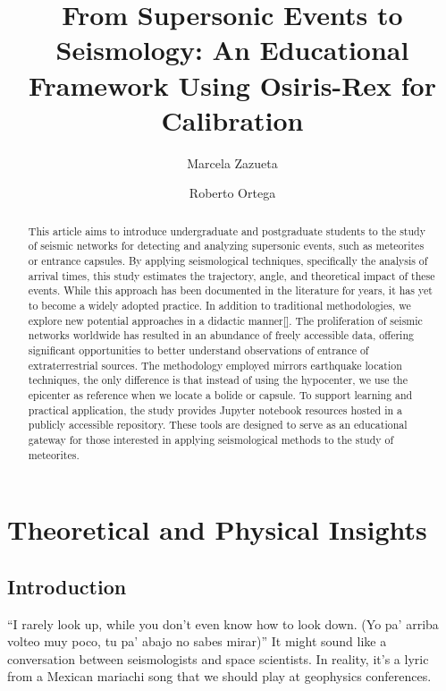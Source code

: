 \documentclass[linenum]{SSA-SRL}
\begin{document}
\title{From Supersonic Events to Seismology: An Educational Framework Using Osiris-Rex for Calibration}

\author[1\orc{0000-0000-0000-0001}]{Marcela Zazueta}
\author[*1\orc{0000-0002-7741-0679}]{Roberto Ortega}




\begin{abstract}
This article aims to introduce undergraduate and postgraduate students to the study of seismic networks for detecting and analyzing supersonic events, such as meteorites or entrance capsules. By applying seismological techniques, specifically the analysis of arrival times, this study estimates the trajectory, angle, and theoretical impact of these events. While this approach has been documented in the literature for years, it has yet to become a widely adopted practice. In addition to traditional methodologies, we explore new potential approaches in a didactic manner\ref{}. The proliferation of seismic networks worldwide has resulted in an abundance of freely accessible data, offering significant opportunities to better understand observations of entrance of extraterrestrial sources. The methodology employed mirrors earthquake location techniques, the only difference is that instead of using the hypocenter, we use the epicenter as reference when we locate a bolide or capsule. To support learning and practical application, the study provides Jupyter notebook resources hosted in a publicly accessible repository. These tools are designed to serve as an educational gateway for those interested in applying seismological methods to the study of meteorites.

\end{abstract}
\maketitle
\section{Theoretical and Physical Insights}
\subsection{Introduction}
“I rarely look up, while you don’t even know how to look down. (Yo pa' arriba volteo muy poco, tu pa' abajo no sabes mirar)” It might sound like a conversation between seismologists and space scientists. In reality, it’s a lyric from a Mexican mariachi song that we should play at geophysics conferences.
\end{document}
